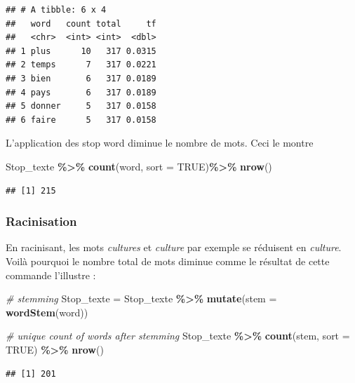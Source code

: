 \documentclass[
]{article}
\newenvironment{Shaded}{\begin{snugshade}}{\end{snugshade}}
\newcommand{\AttributeTok}[1]{\textcolor[rgb]{0.13,0.29,0.53}{#1}}
\newcommand{\CommentTok}[1]{\textcolor[rgb]{0.56,0.35,0.01}{\textit{#1}}}
\newcommand{\ConstantTok}[1]{\textcolor[rgb]{0.56,0.35,0.01}{#1}}
\newcommand{\FunctionTok}[1]{\textcolor[rgb]{0.13,0.29,0.53}{\textbf{#1}}}
\newcommand{\NormalTok}[1]{#1}
\newcommand{\OtherTok}[1]{\textcolor[rgb]{0.56,0.35,0.01}{#1}}
\newcommand{\SpecialCharTok}[1]{\textcolor[rgb]{0.81,0.36,0.00}{\textbf{#1}}}
\begin{document}
\begin{verbatim}
## # A tibble: 6 x 4
##   word   count total     tf
##   <chr>  <int> <int>  <dbl>
## 1 plus      10   317 0.0315
## 2 temps      7   317 0.0221
## 3 bien       6   317 0.0189
## 4 pays       6   317 0.0189
## 5 donner     5   317 0.0158
## 6 faire      5   317 0.0158
\end{verbatim}

L'application des stop word diminue le nombre de mots. Ceci le montre

\begin{Shaded}
\begin{Highlighting}[]
\NormalTok{Stop\_texte }\SpecialCharTok{\%\textgreater{}\%}
  \FunctionTok{count}\NormalTok{(word, }\AttributeTok{sort =} \ConstantTok{TRUE}\NormalTok{)}\SpecialCharTok{\%\textgreater{}\%}
  \FunctionTok{nrow}\NormalTok{()}
\end{Highlighting}
\end{Shaded}

\begin{verbatim}
## [1] 215
\end{verbatim}

\subsubsection{Racinisation}\label{racinisation}

En racinisant, les mots \emph{cultures} et \emph{culture} par exemple se
réduisent en \emph{culture}. Voilà pourquoi le nombre total de mots
diminue comme le résultat de cette commande l'illustre :

\begin{Shaded}
\begin{Highlighting}[]
\CommentTok{\# stemming}
\NormalTok{Stop\_texte }\OtherTok{=}\NormalTok{ Stop\_texte }\SpecialCharTok{\%\textgreater{}\%}
  \FunctionTok{mutate}\NormalTok{(}\AttributeTok{stem =} \FunctionTok{wordStem}\NormalTok{(word))}

\CommentTok{\# unique count of words after stemming}
\NormalTok{Stop\_texte }\SpecialCharTok{\%\textgreater{}\%}
  \FunctionTok{count}\NormalTok{(stem, }\AttributeTok{sort =} \ConstantTok{TRUE}\NormalTok{) }\SpecialCharTok{\%\textgreater{}\%}
  \FunctionTok{nrow}\NormalTok{()}
\end{Highlighting}
\end{Shaded}

\begin{verbatim}
## [1] 201
\end{verbatim}
\end{document}
